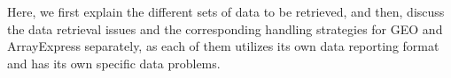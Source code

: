 
Here, we first explain the different sets of data to be retrieved, and
then, discuss the data retrieval issues and the corresponding handling
strategies for GEO and ArrayExpress separately, as each of them
utilizes its own data reporting format and has its own specific data
problems.



%

